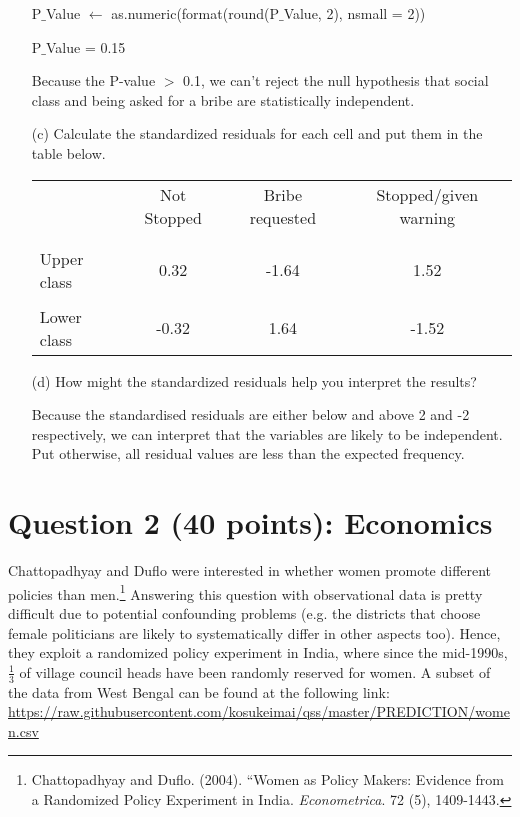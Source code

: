 \documentclass[12pt,letterpaper]{article}
\begin{document}
\begin{enumerate}
		P$\_$Value $\gets$ as.numeric(format(round(P$\_$Value, 2), nsmall = 2))
		
		P$\_$Value = 0.15 

		Because the P-value $>$ 0.1, we can't reject the null hypothesis that social class and being asked for a bribe are statistically independent.
	\vspace{2cm}
		\item [(c)] Calculate the standardized residuals for each cell and put them in the table below.
		\vspace{1cm}
		
		\begin{table}[h]
			\centering
			\begin{tabular}{l | c c c }
				& Not Stopped & Bribe requested & Stopped/given warning \\
				\\[-1.8ex] 
				\hline \\[-1.8ex]
				Upper class & 0.32 & -1.64 & 1.52 \\
				\\
				Lower class & -0.32 & 1.64  & -1.52  \\
			\end{tabular}
		\end{table}
		
		
		\vspace{2cm}
		\item [(d)] How might the standardized residuals help you interpret the results? 
		 
		Because the standardised residuals are either below and above 2 and -2 respectively, we can interpret that the variables are likely to be independent. Put otherwise, all residual values are less than the expected frequency.
	\end{enumerate}
	\newpage
	
	\section*{Question 2 (40 points): Economics}
	Chattopadhyay and Duflo were interested in whether women promote different policies than men.\footnote{Chattopadhyay and Duflo. (2004). ``Women as Policy Makers: Evidence from a Randomized Policy Experiment in India. \textit{Econometrica}. 72 (5), 1409-1443.} Answering this question with observational data is pretty difficult due to potential confounding problems (e.g. the districts that choose female politicians are likely to systematically differ in other aspects too). Hence, they exploit a randomized policy experiment in India, where since the mid-1990s, $\frac{1}{3}$ of village council heads have been randomly reserved for women. A subset of the data from West Bengal can be found at the following link: \url{https://raw.githubusercontent.com/kosukeimai/qss/master/PREDICTION/women.csv}\\
	
\end{document}

